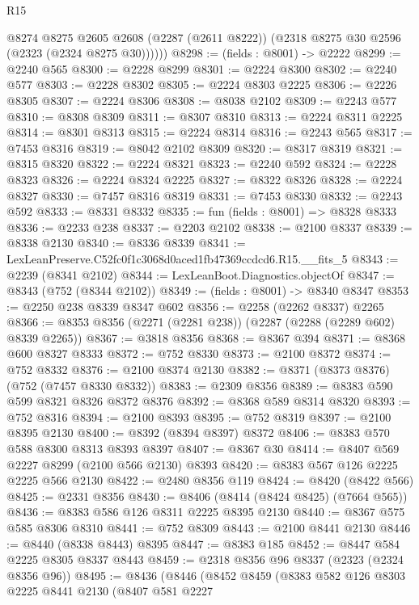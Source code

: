 \begin{lexlean}{R15}
\begin{coremodule}
        @8274
          @8275
          @2605
          @2608
          (@2287 (@2611 @8222))
          (@2318 @8275 @30 @2596 (@2323 (@2324 @8275 @30))))))
@8298 := (fields : @8001) -> @2222
@8299 := @2240 @565
@8300 := @2228 @8299
@8301 := @2224 @8300
@8302 := @2240 @577
@8303 := @2228 @8302
@8305 := @2224 @8303 @2225
@8306 := @2226 @8305
@8307 := @2224 @8306
@8308 := @8038 @2102
@8309 := @2243 @577
@8310 := @8308 @8309
@8311 := @8307 @8310
@8313 := @2224 @8311 @2225
@8314 := @8301 @8313
@8315 := @2224 @8314
@8316 := @2243 @565
@8317 := @7453 @8316
@8319 := @8042 @2102 @8309
@8320 := @8317 @8319
@8321 := @8315 @8320
@8322 := @2224 @8321
@8323 := @2240 @592
@8324 := @2228 @8323
@8326 := @2224 @8324 @2225
@8327 := @8322 @8326
@8328 := @2224 @8327
@8330 := @7457 @8316 @8319
@8331 := @7453 @8330
@8332 := @2243 @592
@8333 := @8331 @8332
@8335 := fun (fields : @8001) => @8328 @8333
@8336 := @2233 @238
@8337 := @2203 @2102
@8338 := @2100 @8337
@8339 := @8338 @2130
@8340 := @8336 @8339
@8341 := LexLeanPreserve.C52fc0f1c3068d0aced1fb47369ccdcd6.R15.__fits_5
@8343 := @2239 (@8341 @2102)
@8344 := LexLeanBoot.Diagnostics.objectOf
@8347 := @8343 (@752 (@8344 @2102))
@8349 := (fields : @8001) -> @8340 @8347
@8353 := @2250 @238 @8339 @8347 @602
@8356 := @2258 (@2262 @8337) @2265
@8366 := @8353 @8356 (@2271 (@2281 @238)) (@2287 (@2288 (@2289 @602) @8339 @2265))
@8367 := @3818 @8356
@8368 := @8367 @394
@8371 := @8368 @600 @8327 @8333
@8372 := @752 @8330
@8373 := @2100 @8372
@8374 := @752 @8332
@8376 := @2100 @8374 @2130
@8382 := @8371 (@8373 @8376) (@752 (@7457 @8330 @8332))
@8383 := @2309 @8356
@8389 := @8383 @590 @599 @8321 @8326 @8372 @8376
@8392 := @8368 @589 @8314 @8320
@8393 := @752 @8316
@8394 := @2100 @8393
@8395 := @752 @8319
@8397 := @2100 @8395 @2130
@8400 := @8392 (@8394 @8397) @8372
@8406 := @8383 @570 @588 @8300 @8313 @8393 @8397
@8407 := @8367 @30
@8414 := @8407 @569 @2227 @8299 (@2100 @566 @2130) @8393
@8420 := @8383 @567 @126 @2225 @2225 @566 @2130
@8422 := @2480 @8356 @119
@8424 := @8420 (@8422 @566)
@8425 := @2331 @8356
@8430 := @8406 (@8414 (@8424 @8425) (@7664 @565))
@8436 := @8383 @586 @126 @8311 @2225 @8395 @2130
@8440 := @8367 @575 @585 @8306 @8310
@8441 := @752 @8309
@8443 := @2100 @8441 @2130
@8446 := @8440 (@8338 @8443) @8395
@8447 := @8383 @185
@8452 := @8447 @584 @2225 @8305 @8337 @8443
@8459 := @2318 @8356 @96 @8337 (@2323 (@2324 @8356 @96))
@8495 := @8436
    (@8446
      (@8452
        @8459
        (@8383
          @582
          @126
          @8303
          @2225
          @8441
          @2130
          (@8407
            @581
            @2227

\end{coremodule}
\end{lexlean}
